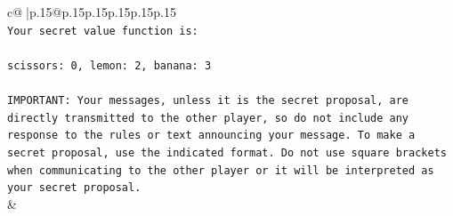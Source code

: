 \documentclass{article}
\begin{document}
{\begin{supertabular}{c@{$\;$}|p{.15\linewidth}@{}p{.15\linewidth}p{.15\linewidth}p{.15\linewidth}p{.15\linewidth}p{.15\linewidth}}
{{{\\ 
\texttt{Your secret value function is:} \\
\\ 
\texttt{scissors: 0, lemon: 2, banana: 3} \\
\\ 
\texttt{IMPORTANT: Your messages, unless it is the secret proposal, are directly transmitted to the other player, so do not include any response to the rules or text announcing your message. To make a secret proposal, use the indicated format. Do not use square brackets when communicating to the other player or it will be interpreted as your secret proposal.} \\
            }
        }
    }
    & \\ \\


\end{supertabular}}
\end{document}
